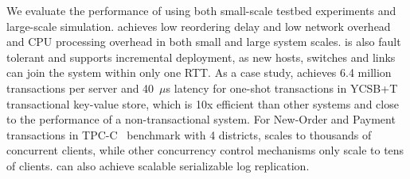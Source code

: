 We evaluate the performance of \sys using both small-scale testbed experiments and large-scale simulation.
\sys achieves low reordering delay and low network overhead and CPU processing overhead in both small and large system scales.
\sys is also fault tolerant and supports incremental deployment, as new hosts, switches and links can join the system within only one RTT.
As a case study, \sys achieves 6.4 million transactions per server and 40~$\mu$s latency for one-shot transactions in YCSB+T~\cite{dey2014ycsbt} transactional key-value store, which is 10x efficient than other systems and close to the performance of a non-transactional system.
For New-Order and Payment transactions in TPC-C~\cite{tpcc} benchmark with 4 districts, \sys scales to thousands of concurrent clients, while other concurrency control mechanisms only scale to tens of clients.
\sys can also achieve scalable serializable log replication.

